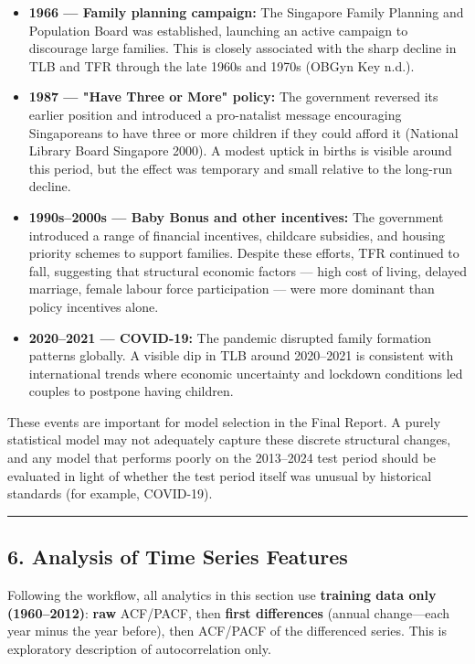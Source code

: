 \documentclass[
]{article}
\providecommand{\tightlist}{%
  \setlength{\itemsep}{0pt}\setlength{\parskip}{0pt}}
\begin{document}
\begin{itemize}
\tightlist
\item
  \textbf{1966 --- Family planning campaign:} The Singapore Family
  Planning and Population Board was established, launching an active
  campaign to discourage large families. This is closely associated with
  the sharp decline in TLB and TFR through the late 1960s and 1970s
  (OBGyn Key n.d.).
\item
  \textbf{1987 --- "Have Three or More" policy:} The government reversed
  its earlier position and introduced a pro-natalist message encouraging
  Singaporeans to have three or more children if they could afford it
  (National Library Board Singapore 2000). A modest uptick in births is
  visible around this period, but the effect was temporary and small
  relative to the long-run decline.
\item
  \textbf{1990s--2000s --- Baby Bonus and other incentives:} The
  government introduced a range of financial incentives, childcare
  subsidies, and housing priority schemes to support families. Despite
  these efforts, TFR continued to fall, suggesting that structural
  economic factors --- high cost of living, delayed marriage, female
  labour force participation --- were more dominant than policy
  incentives alone.
\item
  \textbf{2020--2021 --- COVID-19:} The pandemic disrupted family
  formation patterns globally. A visible dip in TLB around 2020--2021 is
  consistent with international trends where economic uncertainty and
  lockdown conditions led couples to postpone having children.
\end{itemize}

These events are important for model selection in the Final Report. A
purely statistical model may not adequately capture these discrete
structural changes, and any model that performs poorly on the 2013--2024
test period should be evaluated in light of whether the test period
itself was unusual by historical standards (for example, COVID-19).

\begin{center}\rule{0.5\linewidth}{0.5pt}\end{center}

\subsection{6. Analysis of Time Series
Features}\label{analysis-of-time-series-features}

Following the workflow, all analytics in this section use
\textbf{training data only (1960--2012)}: \textbf{raw} ACF/PACF, then
\textbf{first differences} (annual change---each year minus the year
before), then ACF/PACF of the differenced series. This is exploratory
description of autocorrelation only.
\end{document}

